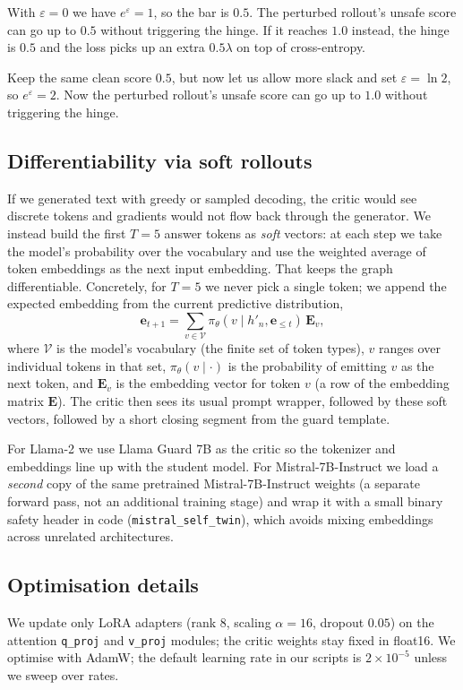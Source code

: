 \documentclass{article}
\begin{document}
With $\varepsilon{=}0$ we have $e^{\varepsilon}{=}1$, so the bar is $0.5$. The perturbed rollout's unsafe score can go up to $0.5$ without triggering the hinge. If it reaches $1.0$ instead, the hinge is $0.5$ and the loss picks up an extra $0.5\lambda$ on top of cross-entropy.

Keep the same clean score $0.5$, but now let us allow more slack and set $\varepsilon{=}\ln 2$, so $e^{\varepsilon}{=}2$. Now the perturbed rollout’s unsafe score can go up to $1.0$ without triggering the hinge.

\subsection{Differentiability via soft rollouts}
If we generated text with greedy or sampled decoding, the critic would see discrete tokens and gradients would not flow back through the generator. We instead build the first $T{=}5$ answer tokens as \emph{soft} vectors: at each step we take the model's probability over the vocabulary and use the weighted average of token embeddings as the next input embedding. That keeps the graph differentiable. Concretely, for $T{=}5$ we never pick a single token; we append the expected embedding from the current predictive distribution,
\[
\mathbf{e}_{t+1}=\sum_{v\in\mathcal{V}} \pi_\theta(v\mid h'_n,\mathbf{e}_{\le t})\,\mathbf{E}_v,
\]
where $\mathcal{V}$ is the model's vocabulary (the finite set of token types), $v$ ranges over individual tokens in that set, $\pi_\theta(v\mid\cdot)$ is the probability of emitting $v$ as the next token, and $\mathbf{E}_v$ is the embedding vector for token $v$ (a row of the embedding matrix $\mathbf{E}$). The critic then sees its usual prompt wrapper, followed by these soft vectors, followed by a short closing segment from the guard template.

For Llama-2 we use Llama Guard 7B as the critic \citep{inan2023llamaguard} so the tokenizer and embeddings line up with the student model. For Mistral-7B-Instruct we load a \emph{second} copy of the same pretrained Mistral-7B-Instruct weights (a separate forward pass, not an additional training stage) and wrap it with a small binary safety header in code (\texttt{mistral\_self\_twin}), which avoids mixing embeddings across unrelated architectures.

\subsection{Optimisation details}
We update only LoRA adapters (rank $8$, scaling $\alpha{=}16$, dropout $0.05$) on the attention \texttt{q\_proj} and \texttt{v\_proj} modules; the critic weights stay fixed in float16. We optimise with AdamW; the default learning rate in our scripts is $2{\times}10^{-5}$ unless we sweep over rates.
\end{document}
